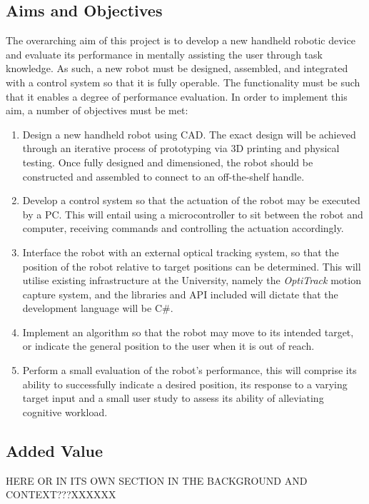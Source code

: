 \documentclass[11pt]{article}
\begin{document}
\subsection{Aims and Objectives}
The overarching aim of this project is to develop a new handheld robotic device and evaluate its performance in mentally assisting the user through task knowledge. As such, a new robot must be designed, assembled, and integrated with a control system so that it is fully operable. The functionality must be such that it enables a degree of performance evaluation. In order to implement this aim, a number of objectives must be met:
\begin{enumerate}
\item{Design a new handheld robot using CAD. The exact design will be achieved through an iterative process of prototyping via 3D printing and physical testing. Once fully designed and dimensioned, the robot should be constructed and assembled to connect to an off-the-shelf handle.}
\item{Develop a control system so that the actuation of the robot may be executed by a PC. This will entail using a microcontroller to sit between the robot and computer, receiving commands and controlling the actuation accordingly.}
\item{Interface the robot with an external optical tracking system, so that the position of the robot relative to target positions can be determined. This will utilise existing infrastructure at the University, namely the \textit{OptiTrack} motion capture system, and the libraries and API included will dictate that the development language will be C\#.}
\item{Implement an algorithm so that the robot may move to its intended target, or indicate the general position to the user when it is out of reach.}
\item{Perform a small evaluation of the robot's performance, this will comprise its ability to successfully indicate a desired position, its response to a varying target input and a small user study to assess its ability of alleviating cognitive workload.}
\end{enumerate}

\subsection{Added Value}
HERE OR IN ITS OWN SECTION IN THE BACKGROUND AND CONTEXT???XXXXXX
\end{document}
